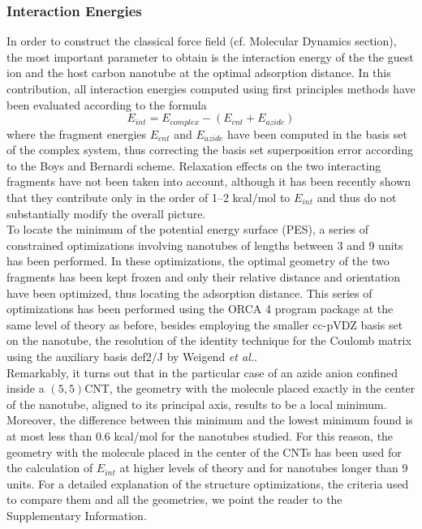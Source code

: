 \documentclass[utf8]{article}
\begin{document}
\subsubsection{Interaction Energies}
In order to construct the classical force field (cf. Molecular Dynamics section), the most important parameter to obtain is the interaction energy of the the guest \ntm ion and the host carbon nanotube at the optimal adsorption distance.
In this contribution, all interaction energies computed using first principles methods have been evaluated according to the formula
%
\begin{equation}
    E_{int} = E_{complex} - (E_{cnt} + E_{azide}) \label{eq:eint}
\end{equation}
%
where the fragment energies $E_{cnt}$ and $E_{azide}$ have been computed in the basis set of the complex system, thus correcting the basis set superposition error according to the Boys and Bernardi scheme\cite{Boys1970}.
Relaxation effects on the two interacting fragments have not been taken into account, although it has been recently shown that they contribute only in the order of 1--2 kcal/mol\cite{Battaglia2017a} to $E_{int}$ and thus do not substantially modify the overall picture.\\
To locate the minimum of the potential energy surface (PES), a series of constrained optimizations involving nanotubes of lengths between 3 and 9 units has been performed. In these optimizations, the optimal geometry of the two fragments has been kept frozen and only their relative distance and orientation have been optimized, thus locating the adsorption distance.
This series of optimizations has been performed using the ORCA 4 program package\cite{ORCA4} at the same level of theory as before, besides employing the smaller cc-pVDZ basis set on the nanotube, the resolution of the identity technique for the Coulomb matrix using the auxiliary basis def2/J by Weigend \textit{et al.}\cite{Weigend2006}.\\
Remarkably, it turns out that in the particular case of an azide anion confined inside a $(5,5)$CNT, the geometry with the \ntm molecule placed exactly in the center of the nanotube, aligned to its principal axis, results to be a local minimum. Moreover, the difference between this minimum and the lowest minimum found is at most less than $0.6$ kcal/mol for the nanotubes studied. For this reason, the geometry with the \ntm molecule placed in the center of the CNTs has been used for the calculation of $E_{int}$ at higher levels of theory and for nanotubes longer than 9 units.
For a detailed explanation of the structure optimizations, the criteria used to compare them and all the geometries, we point the reader to the Supplementary Information.\\
\end{document}
